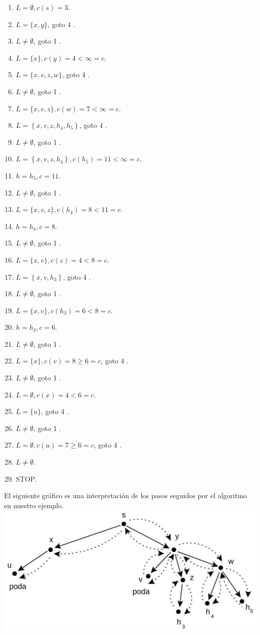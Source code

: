 \documentclass[10pt]{article}
\begin{document}
\begin{enumerate}
  \item $L=\emptyset, c(s)=3$.
  \item $L=\{x, y\}$, goto 4 .
  \item $L \neq \emptyset$, goto 1 .
  \item $L=\{x\}, c(y)=4<\infty=c$.
  \item $L=\{x, v, z, w\}$, goto 4 .
  \item $L \neq \emptyset$, goto 1 .
  \item $L=\{x, v, z\}, c(w)=7<\infty=c$.
  \item $L=\left\{x, v, z, h_{4}, h_{5}\right\}$, goto 4 .
  \item $L \neq \emptyset$, goto 1 .
  \item $L=\left\{x, v, z, h_{4}\right\}, c\left(h_{5}\right)=11<\infty=c$.
  \item $h=h_{5}, c=11$.
  \item $L \neq \emptyset$, goto 1 .
  \item $L=\{x, v, z\}, c\left(h_{4}\right)=8<11=c$.
  \item $h=h_{4}, c=8$.
  \item $L \neq \emptyset$, goto 1 .
  \item $L=\{x, v\}, c(z)=4<8=c$.
  \item $L=\left\{x, v, h_{3}\right\}$, goto 4 .
  \item $L \neq \emptyset$, goto 1 .
  \item $L=\{x, v\}, c\left(h_{3}\right)=6<8=c$.
  \item $h=h_{3}, c=6$.
  \item $L \neq \emptyset$, goto 1 .
  \item $L=\{x\}, c(v)=8 \geq 6=c$, goto 4 .
  \item $L \neq \emptyset$, goto 1 .
  \item $L=\emptyset, c(x)=4<6=c$.
  \item $L=\{u\}$, goto 4 .
  \item $L \neq \emptyset$, goto 1 .
  \item $L=\emptyset, c(u)=7 \geq 6=c$, goto 4 .
  \item $L \neq \emptyset$.
  \item STOP.
\end{enumerate}

El siguiente gráfico es una interpretación de los pasos seguidos por el algoritmo en nuestro ejemplo.\\
\includegraphics[max width=\textwidth, center]{2025_09_05_458e5b1ce89abceb5d44g-17}
\end{document}
